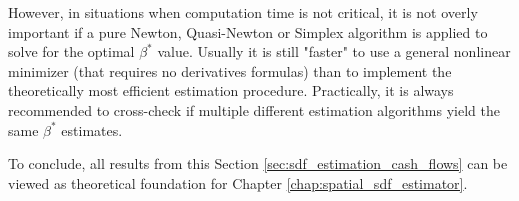 However, in situations when computation time is not critical, it is not overly important if a pure Newton, Quasi-Newton or Simplex algorithm is applied to solve for the optimal $\beta^*$ value.
Usually it is still "faster" to use a general nonlinear minimizer (that requires no derivatives formulas) than to implement the theoretically most efficient estimation procedure.
Practically, it is always recommended to cross-check if multiple different estimation algorithms yield the same $\beta^*$ estimates.

To conclude, all results from this Section \ref{sec:sdf_estimation_cash_flows} can be viewed as theoretical foundation for Chapter \ref{chap:spatial_sdf_estimator}.

